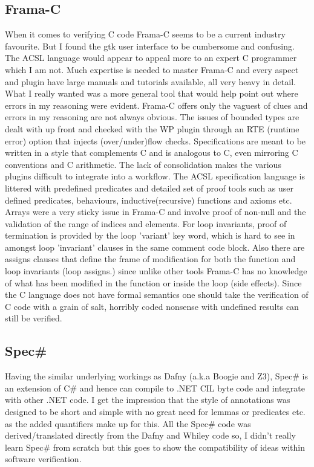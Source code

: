 \documentclass[10pt]{article} %
\begin{document}
\subsection{Frama-C}
When it comes to verifying C code Frama-C seems to be a current industry favourite. But I found the gtk user interface to be cumbersome and confusing. The ACSL language would appear to appeal more to an expert C programmer which I am not. Much expertise is needed to master Frama-C and every aspect and plugin have large manuals and tutorials available, all very heavy in detail. What I really wanted was a more general tool that would help point out where errors in my reasoning were evident. Frama-C offers only the vaguest of clues and errors in my reasoning are not always obvious. The issues of bounded types are dealt with up front and checked with the WP plugin through an RTE (runtime error) option that injects (over\slash under)flow checks. Specifications are meant to be written in a style that complements C and is analogous to C, even mirroring C conventions and C arithmetic. The lack of consolidation makes the various plugins difficult to integrate into a workflow. The ACSL specification language is littered with predefined predicates and detailed set of proof tools such as user defined predicates, behaviours, inductive(recursive) functions and axioms etc. Arrays were a very sticky issue in Frama-C and involve proof of non-null and the validation of the range of indices and elements. For loop invariants, proof of termination is provided by the loop 'variant' key word, which is hard to see in amongst loop 'invariant' clauses in the same comment code block. Also there are assigns clauses that define the frame of modification for both the function and loop invariants (loop assigns.) since unlike other tools Frama-C has no knowledge of what has been modified in the function or inside the loop (side effects). Since the C language does not have formal semantics one should take the verification of C code with a grain of salt, horribly coded nonsense with undefined results can still be verified.
\subsection{Spec\#}
Having the similar underlying workings as Dafny (a.k.a Boogie and Z3), Spec\# is an extension of C\# and hence can compile to .NET CIL byte code and integrate with other .NET code. I get the impression that the style of annotations was designed to be short and simple with no great need for lemmas or predicates etc. as the added quantifiers make up for this. All the Spec\# code was derived/translated directly from the Dafny and Whiley code so, I didn't really learn Spec\# from scratch but this goes to show the compatibility of ideas within software verification.
\newpage
\end{document}
